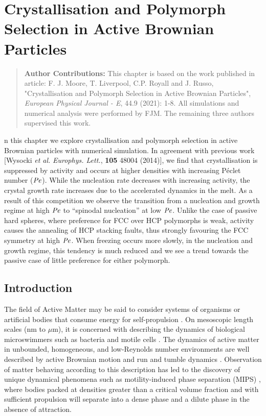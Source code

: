 %
% 
% 
\let\textcircled=\pgftextcircled
\chapter{Crystallisation and Polymorph Selection in Active Brownian Particles}
\label{chap:crystal}

\begin{quote}
	\textbf{Author Contributions:} This chapter is based on the work published in article: F. J. Moore, T. Liverpool, C.P. Royall and J. Russo, "Crystallisation and Polymorph Selection in Active Brownian Particles", \textit{European Physical Journal - E}, 44.9 (2021): 1-8. All simulations and numerical analysis were performed by FJM. The remaining three authors supervised this work.
\end{quote}



n this chapter we explore crystallisation and polymorph selection in active Brownian particles with numerical simulation. In agreement with previous work  [Wysocki \emph{et al.} \emph{Europhys. Lett.}, \textbf{105} 48004 (2014)], we find that crystallisation is suppressed by activity and occurs at higher densities with increasing P\'{e}clet number ($\operatorname{\mathit{P\kern-.08em e}}$). While the nucleation rate decreases with increasing activity, the crystal growth rate increases due to the accelerated dynamics in the melt. As a result of this competition we observe the transition from a nucleation and growth regime at high $\operatorname{\mathit{P\kern-.08em e}}$ to ``spinodal nucleation'' at low $\operatorname{\mathit{P\kern-.08em e}}$. Unlike the case of passive hard spheres, where preference for FCC over HCP polymorphs is weak, activity causes the annealing of HCP stacking faults, thus strongly favouring the FCC symmetry at high $\operatorname{\mathit{P\kern-.08em e}}$.  When freezing occurs more slowly, in the nucleation and growth regime, this tendency is much reduced and we see a trend towards the passive case of little preference for either polymorph.


\section{Introduction}
\label{sec:introduction02}

The field of Active Matter may be said to consider systems of organisms or artificial bodies that consume energy for self-propulsion \cite{ramaswamy2017}. On mesoscopic length scales (nm to $\mu$m), it is concerned with describing the dynamics of biological microswimmers \cite{elgeti2015} such as bacteria and motile cells \cite{henkes2020}. The dynamics of active matter in unbounded, homogeneous, and low-Reynolds number environments are well described by active Brownian motion and run and tumble dynamics \cite{bechinger2016a}. Observation of matter behaving according to this description has led to the discovery of unique dynamical phenomena such as motility-induced phase separation (MIPS) \cite{cates2015}, where bodies packed at densities greater than a critical volume fraction and with sufficient propulsion will separate into a dense phase and a dilute phase in the absence of attraction.\cite{marchetti2016}


